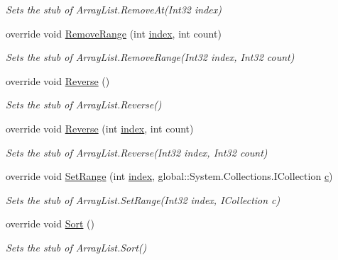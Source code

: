 \begin{DoxyCompactItemize}
\begin{DoxyCompactList}\small\item\em Sets the stub of Array\-List.\-Remove\-At(\-Int32 index)\end{DoxyCompactList}\item 
override void \hyperlink{class_system_1_1_collections_1_1_fakes_1_1_stub_array_list_a9a028c74f3400b403dc46c9a2cb929ac}{Remove\-Range} (int \hyperlink{jquery-1_810_82-vsdoc_8js_a75bb12d1f23302a9eea93a6d89d0193e}{index}, int count)
\begin{DoxyCompactList}\small\item\em Sets the stub of Array\-List.\-Remove\-Range(\-Int32 index, Int32 count)\end{DoxyCompactList}\item 
override void \hyperlink{class_system_1_1_collections_1_1_fakes_1_1_stub_array_list_a7bd70be6570eda43539a873980c24ab5}{Reverse} ()
\begin{DoxyCompactList}\small\item\em Sets the stub of Array\-List.\-Reverse()\end{DoxyCompactList}\item 
override void \hyperlink{class_system_1_1_collections_1_1_fakes_1_1_stub_array_list_acf3192dbcf3ed929b85166a71dc6ba56}{Reverse} (int \hyperlink{jquery-1_810_82-vsdoc_8js_a75bb12d1f23302a9eea93a6d89d0193e}{index}, int count)
\begin{DoxyCompactList}\small\item\em Sets the stub of Array\-List.\-Reverse(\-Int32 index, Int32 count)\end{DoxyCompactList}\item 
override void \hyperlink{class_system_1_1_collections_1_1_fakes_1_1_stub_array_list_a04b1dd90508961bb790d8a157dc80592}{Set\-Range} (int \hyperlink{jquery-1_810_82-vsdoc_8js_a75bb12d1f23302a9eea93a6d89d0193e}{index}, global\-::\-System.\-Collections.\-I\-Collection \hyperlink{bootstrap_8min_8js_abce695e0af988ece0826d9ad59b8160d}{c})
\begin{DoxyCompactList}\small\item\em Sets the stub of Array\-List.\-Set\-Range(\-Int32 index, I\-Collection c)\end{DoxyCompactList}\item 
override void \hyperlink{class_system_1_1_collections_1_1_fakes_1_1_stub_array_list_a7f3600b361990479d35fd3d1b9c023a4}{Sort} ()
\begin{DoxyCompactList}\small\item\em Sets the stub of Array\-List.\-Sort()\end{DoxyCompactList}\item 

\end{DoxyCompactItemize}
